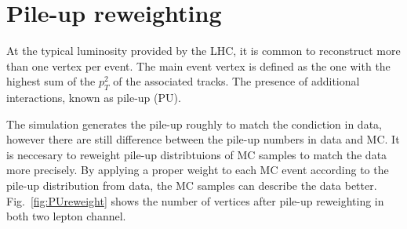 %
\section{Pile-up reweighting}
At the typical luminosity provided by the LHC, it is common to reconstruct more than one vertex per event. The main event vertex is defined as the one with the highest sum of the $p_{T}^{2}$ of the associated tracks. The presence of additional interactions, known as pile-up (PU). 

The simulation generates the pile-up roughly to match the condiction in data, however there are still difference between the pile-up numbers in data and MC. It is neccesary to reweight pile-up distribtuions of MC samples to match the data more precisely. By applying a proper weight to each MC event according to the pile-up distribution from data, the MC samples can describe the data better. Fig.~\ref{fig:PUreweight} shows the number of vertices after pile-up reweighting in both two lepton channel.

